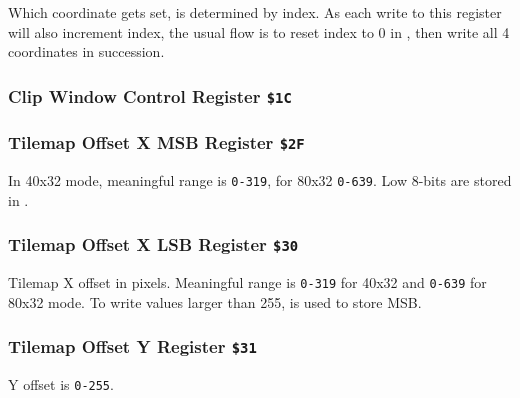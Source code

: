 Which coordinate gets set, is determined by index. As each write to this register will also increment index, the usual flow is to reset index to 0 in , then write all 4 coordinates in succession.


\subsubsection{Clip Window Control Register {\tt \$1C}}



\subsubsection{Tilemap Offset X MSB Register {\tt \$2F}}

\begin{NextPort}
\end{NextPort}

In 40x32 mode, meaningful range is {\tt 0-319}, for 80x32 {\tt 0-639}. Low 8-bits are stored in .


\subsubsection{Tilemap Offset X LSB Register {\tt \$30}}

\begin{NextPort}
\end{NextPort}

Tilemap X offset in pixels. Meaningful range is {\tt 0-319} for 40x32 and {\tt 0-639} for 80x32 mode. To write values larger than 255,  is used to store MSB.


\subsubsection{Tilemap Offset Y Register {\tt \$31}}

\begin{NextPort}
\end{NextPort}

Y offset is {\tt 0-255}.


